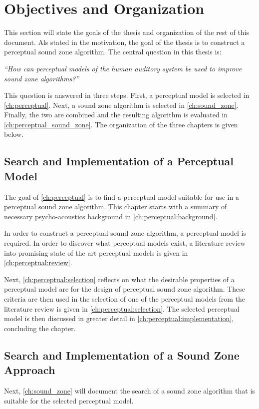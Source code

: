 \section{Objectives and Organization}
\label{ch:introduction:objectives}
This section will state the goals of the thesis and organization of the rest of this document.
Als stated in the motivation, the goal of the thesis is to construct a perceptual sound zone algorithm.
The central question in this thesis is: 

{\centering\textit{``How can perceptual models of the human auditory system be used to improve sound zone algorithms?''}}

This question is answered in three steps. 
First, a perceptual model is selected in \autoref{ch:perceptual}.
Next, a sound zone algorithm is selected in \autoref{ch:sound_zone}.
Finally, the two are combined and the resulting algorithm is evaluated in \autoref{ch:perceptual_sound_zone}.
The organization of the three chapters is given below.

\subsection{Search and Implementation of a Perceptual Model}
\label{ch:introduction:objectives:perceptual}
The goal of \autoref{ch:perceptual} is to find a perceptual model suitable for use in a perceptual sound zone algorithm.
This chapter starts with a summary of necessary psycho-acoustics background in \autoref{ch:perceptual:background}.

In order to construct a perceptual sound zone algorithm, a perceptual model is required.
In order to discover what perceptual models exist, a literature review into promising state of the art perceptual models 
is given in \autoref{ch:perceptual:review}.

Next, \autoref{ch:perceptual:selection} reflects on what the desirable properties of a perceptual model are for
the design of perceptual sound zone algorithm.
These criteria are then used in the selection of one of the perceptual models from the literature review is given in \autoref{ch:perceptual:selection}.
The selected perceptual model is then discussed in greater detail in \autoref{ch:perceptual:implementation}, concluding the chapter. 

\subsection{Search and Implementation of a Sound Zone Approach}
\label{ch:introduction:objectives:sound_zone}
Next, \autoref{ch:sound_zone} will document the search of a sound zone algorithm that is suitable for the selected perceptual model.

